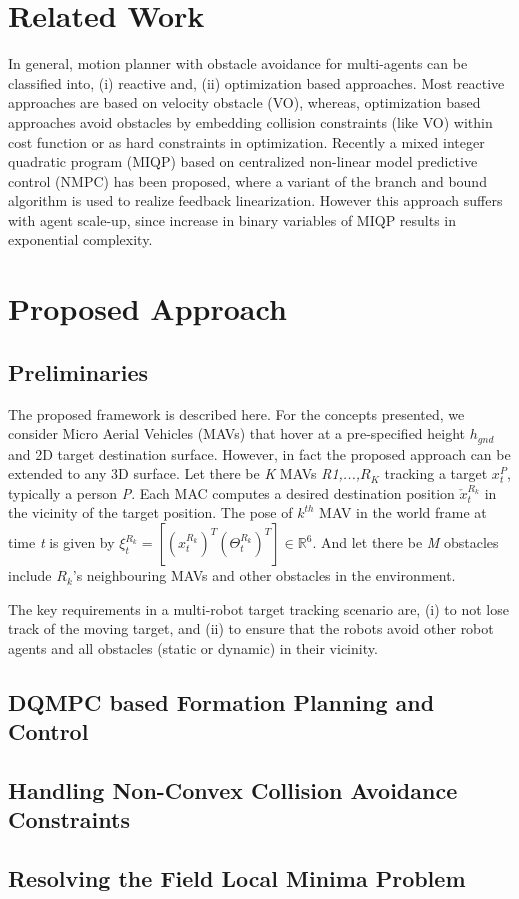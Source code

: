 \documentclass[letterpaper,12pt]{article}
\begin{document}
\section{Related Work}
In general, motion planner with obstacle avoidance for multi-agents can be classified into, (i) reactive and, (ii) optimization based approaches. Most reactive approaches are based on velocity obstacle (VO), whereas, optimization based approaches avoid obstacles by embedding collision constraints (like VO) within cost function or as hard constraints in optimization. Recently a mixed integer quadratic program (MIQP) based on centralized non-linear model predictive control (NMPC) \cite{fukushima2013model} has been proposed, where a variant of the branch and bound algorithm is used to realize feedback linearization. However this approach suffers with agent scale-up, since increase in binary variables of MIQP results in exponential complexity. 

\section{Proposed Approach}
\subsection{Preliminaries}
The proposed framework is described here. For the concepts presented, we consider Micro Aerial Vehicles (MAVs) that hover at a pre-specified height $h_{gnd}$ and 2D target destination surface. However, in fact the proposed approach can be extended to any 3D surface. Let there be \emph{K} MAVs \emph{R1,...,$R_{K}$} tracking a target $x_{t}^{P}$, typically a person \emph{P}. Each MAC computes a desired destination position $\check{x}_{t}^{R_{k}}$ in the vicinity of the target position. The pose of $k^{th}$ MAV in the world frame at time \emph{t} is given by $\xi_{t}^{R_{k}} = [(x_{t}^{R_{k}})^{T} (\Theta_{t}^{R_{k}})^{T}] \in \mathbb{R}^{6}$. And let there be \emph{M} obstacles include $R_{k}$'s neighbouring MAVs and other obstacles in the environment.

The key requirements in a multi-robot target tracking scenario are, (i) to not lose track of the moving target, and (ii) to ensure that the robots avoid other robot agents and all obstacles (static or dynamic) in their vicinity. 
\subsection{DQMPC based Formation Planning and Control}
\subsection{Handling Non-Convex Collision Avoidance Constraints}

\subsection{Resolving the Field Local Minima Problem}




\end{document}
